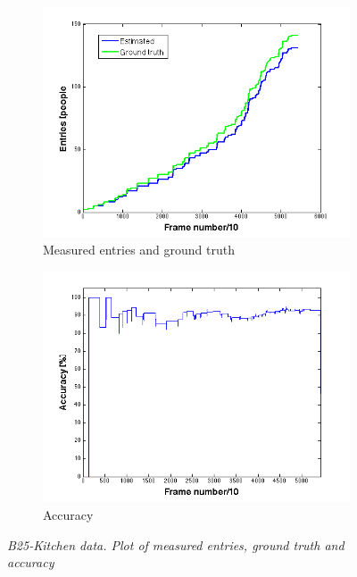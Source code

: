 \begin{figure}[h]
\centering
\begin{subfigure}{.5\textwidth}
  \centering
  \includegraphics[width=1.0\linewidth]{images/entriesGTB25.png}
  \caption{Measured entries and ground truth}
  \label{fig:sub1}
\end{subfigure}%
\begin{subfigure}{.5\textwidth}
  \centering
  \includegraphics[width=1.0\linewidth]{images/accInB25.png}
  \caption{Accuracy}
  \label{fig:sub2}
\end{subfigure}
\caption[B25-kitchen entries]{\textit{B25-Kitchen data. Plot of measured entries, ground truth and accuracy}}
\label{fig:B25-kitchen entries}
\end{figure}

